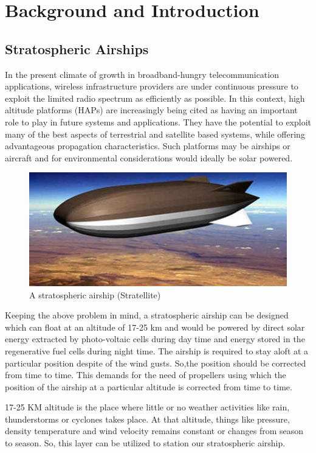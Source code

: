 
\newcommand{\etas}{\ensuremath{\eta_{\mathrm{s}}}}


\chapter{Background and Introduction}

\section{Stratospheric Airships}
In the present climate of growth in broadband-hungry telecommunication applications, wireless infrastructure providers are under continuous pressure to exploit the limited radio spectrum as efficiently as possible. In this context, high altitude platforms (HAPs) are increasingly being cited as having an important role to play in future systems and applications. They have the potential to exploit many of the best aspects of terrestrial and satellite based systems, while offering advantageous propagation characteristics. Such platforms may be airships or aircraft and for environmental considerations would ideally be solar powered.
\begin{figure}[htbp]
	\centering
	\includegraphics{intro/Stratellite.jpg}
	\caption{A stratospheric airship (Stratellite)}
	\label{Stratellite} %
\end{figure}

Keeping the above problem in mind, a stratospheric airship can be designed which can float at an altitude of 17-25 km and would be powered by direct solar energy extracted by photo-voltaic cells during day time and energy stored in the regenerative fuel cells during night time. The airship is required to stay aloft at a particular position despite of the wind gusts. So,the position should be corrected from time to time. This demands for the need of propellers using which the position of the airship at a particular altitude is corrected from time to time.

17-25 KM altitude is the place where little or no weather activities like rain, thunderstorms or cyclones takes place. At that altitude, things like pressure, density temperature and wind velocity remains constant or changes from season to season. So, this layer can be utilized to station our stratospheric airship.

